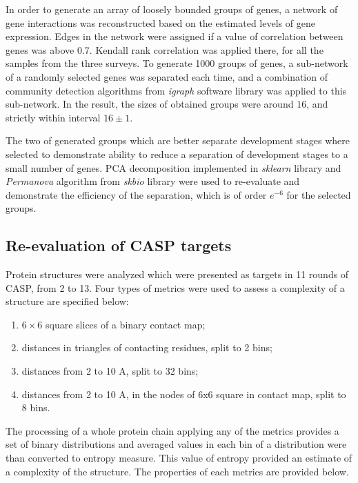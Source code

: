 \documentclass[12pt,aps]{revtex4}
\begin{document}
In order to generate an array of loosely bounded groups of genes, a network of gene interactions was reconstructed based on the estimated levels of gene expression. Edges in the network were assigned if a value of correlation between genes was above 0.7.  Kendall rank correlation was applied there, for all the samples from the three surveys. To generate 1000 groups of genes,  a sub-network of a randomly selected genes was separated each time, and a combination of community detection algorithms from \textit{igraph} software library was applied to this sub-network. In the result, the sizes of obtained groups were around $16$, and strictly within interval $16 \pm 1$.

The two of generated groups which are better separate development stages where selected to demonstrate ability to reduce a separation of development stages to a small number of genes. PCA decomposition implemented in \textit{sklearn} library and \textit{Permanova} algorithm from \textit{skbio} library were used to re-evaluate and demonstrate the efficiency of the separation, which is of order $e^{-6}$ for the selected groups.

\subsection{Re-evaluation of CASP targets}

Protein structures were analyzed which were presented as targets in 11 rounds of CASP, from 2 to 13. Four types of metrics were used to assess a complexity of a structure are specified below: 

\begin{enumerate}
\item $6 \times 6$ square slices of a binary contact map; 
\item distances in triangles of contacting residues, split to 2 bins; 
\item distances from 2 to 10 A, split to 32 bins; 
\item distances from 2 to 10 A, in the nodes of 6x6 square in contact map, split to 8 bins. 
\end{enumerate}

The processing of a whole protein chain applying any of the metrics provides a set of binary distributions and averaged values in each bin of a distribution were than converted to entropy measure. This value of entropy provided an estimate of a complexity of the structure. The properties of each metrics are provided below.
\end{document}
